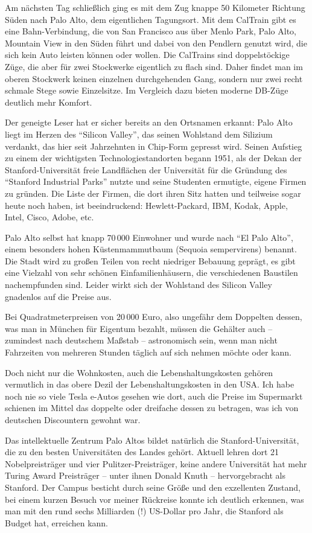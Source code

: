 \documentclass[ngerman]{dtk}
\begin{document}
Am nächsten Tag schließlich ging es mit dem Zug knappe 50 Kilometer Richtung Süden nach Palo Alto, dem eigentlichen Tagungsort. Mit dem CalTrain gibt es eine Bahn-Verbindung, die von San Francisco aus über Menlo Park, Palo Alto, Mountain View in den Süden führt und dabei von den Pendlern genutzt wird, die sich kein Auto leisten können oder wollen. Die CalTrains sind doppelstöckige Züge, die aber für zwei Stockwerke eigentlich zu flach sind. Daher findet man im oberen Stockwerk keinen einzelnen durchgehenden Gang, sondern nur zwei recht schmale Stege sowie Einzelsitze. Im Vergleich dazu bieten moderne DB-Züge deutlich mehr Komfort.

Der geneigte Leser hat er sicher bereits an den Ortsnamen erkannt: Palo Alto liegt im Herzen des \enquote{Silicon Valley}, das seinen Wohlstand dem Silizium verdankt, das hier seit Jahrzehnten in Chip-Form gepresst wird. Seinen Aufstieg zu einem der wichtigsten Technologiestandorten begann 1951, als der Dekan der Stanford-Universität freie Landflächen der Universität für die Gründung des \enquote{Stanford Industrial Parks} nutzte und seine Studenten ermutigte, eigene Firmen zu gründen. Die Liste der Firmen, die dort ihren Sitz hatten und teilweise sogar heute noch haben, ist beeindruckend: Hewlett-Packard, IBM, Kodak, Apple, Intel, Cisco, Adobe, etc.

Palo Alto selbst hat knapp 70\,000 Einwohner und wurde nach \enquote{El Palo Alto}, einem besonders hohen Küstenmammutbaum (Sequoia sempervirens) benannt. Die Stadt wird zu großen Teilen von recht niedriger Bebauung geprägt, es gibt eine Vielzahl von sehr schönen Einfamilienhäusern, die verschiedenen Baustilen nachempfunden sind. Leider wirkt sich der Wohlstand des Silicon Valley gnadenlos auf die Preise aus.

Bei Quadratmeterpreisen von 20\,000 Euro, also ungefähr dem Doppelten dessen, was man in München für Eigentum bezahlt, müssen die Gehälter auch -- zumindest nach deutschem Maßstab -- astronomisch sein, wenn man nicht Fahrzeiten von mehreren Stunden täglich auf sich nehmen möchte oder kann.  

Doch nicht nur die Wohnkosten, auch die Lebenshaltungskosten gehören vermutlich in das obere Dezil der Lebenshaltungskosten in den USA. Ich habe noch nie so viele Tesla e-Autos gesehen wie dort, auch die Preise im Supermarkt schienen im Mittel das doppelte oder dreifache dessen zu betragen, was ich von deutschen Discountern gewohnt war.

Das intellektuelle Zentrum Palo Altos bildet natürlich die Stanford-Universität, die zu den besten Universitäten des Landes gehört. Aktuell lehren dort 21 Nobelpreisträger und vier Pulitzer-Preisträger, keine andere Universität hat mehr Turing Award Preisträger -- unter ihnen Donald Knuth -- hervorgebracht als Stanford. Der Campus besticht durch seine Größe und den exzellenten Zustand, bei einem kurzen Besuch vor meiner Rückreise konnte ich deutlich erkennen, was man mit den rund sechs Milliarden (!) US-Dollar pro Jahr, die Stanford als Budget hat, erreichen kann.
\end{document}
